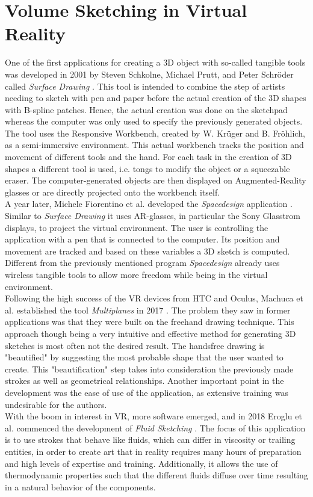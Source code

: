 \documentclass{report}
\begin{document}
	\section{Volume Sketching in Virtual Reality}
	\startsection
		One of the first applications for creating a 3D object with so-called tangible tools was developed in 2001 by Steven Schkolne, Michael Prutt, and Peter Schröder called \textit{Surface Drawing} \cite{SurfaceDrawing}. This tool is intended to combine the step of artists needing to sketch with pen and paper before the actual creation of the 3D shapes with B-spline patches. Hence, the actual creation was done on the sketchpad whereas the computer was only used to specify the previously generated objects. The tool uses the Responsive Workbench, created by W. Krüger and B. Fröhlich, as a semi-immersive environment. This actual workbench tracks the position and movement of different tools and the hand. For each task in the creation of 3D shapes a different tool is used, i.e. tongs to modify the object or a squeezable eraser. The computer-generated objects are then displayed on Augmented-Reality glasses or are directly projected onto the workbench itself. \\
		A year later, Michele Fiorentino et al. developed the \textit{Spacedesign} application \cite{SpaceDesign}. Similar to \textit{Surface Drawing} it uses AR-glasses, in particular the Sony Glasstrom displays, to project the virtual environment. The user is controlling the application with a pen that is connected to the computer. Its position and movement are tracked and based on these variables a 3D sketch is computed. Different from the previously mentioned program \textit{Spacedesign} already uses wireless tangible tools to allow more freedom while being in the virtual environment. \\
		Following the high success of the VR devices from HTC and Oculus, Machuca et al. established the tool \textit{Multiplanes} in 2017 \cite{Multiplanes}. The problem they saw in former applications was that they were built on the freehand drawing technique. This approach though being a very intuitive and effective method for generating 3D sketches is most often not the desired result. The handsfree drawing is "beautified" by suggesting the most probable shape that the user wanted to create. This "beautification" step takes into consideration the previously made strokes as well as geometrical relationships. Another important point in the development was the ease of use of the application, as extensive training was undesirable for the authors. \\
		With the boom in interest in VR, more software emerged, and in 2018 Eroglu et al. commenced the development of \textit{Fluid Sketching} \cite{FluidSketching}. The focus of this application is to use strokes that behave like fluids, which can differ in viscosity or trailing entities, in order to create art that in reality requires many hours of preparation and high levels of expertise and training. Additionally, it allows the use of thermodynamic properties such that the different fluids diffuse over time resulting in a natural behavior of the components.
	\closesection
	
\end{document}
